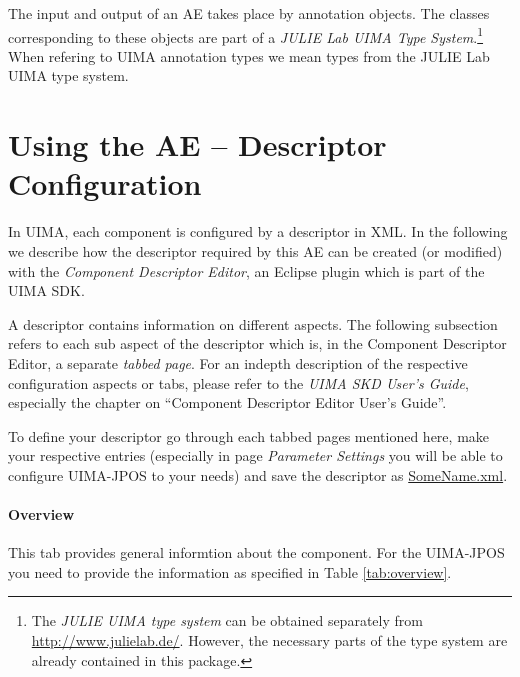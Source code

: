 \documentclass[11pt,a4paper,halfparskip]{scrartcl}
\begin{document}
The input and output of an AE takes place by annotation objects. The
classes corresponding to these objects are part of a \emph{JULIE Lab
  UIMA Type System}.\footnote{The \emph{JULIE UIMA type system} can be
  obtained separately from \url{http://www.julielab.de/}. However, the
  necessary parts of the type system are already contained in this
  package.} When refering to UIMA annotation types we mean types from
the JULIE Lab UIMA type system. 

\section{Using the AE -- Descriptor Configuration}

In UIMA, each component is configured by a descriptor in XML. In the
following we describe how the descriptor required by this AE can be
created (or modified) with the \emph{Component Descriptor Editor}, an
Eclipse plugin which is part of the UIMA SDK.

A descriptor contains information on different aspects. The following
subsection refers to each sub aspect of the descriptor which is, in
the Component Descriptor Editor, a separate \emph{tabbed page}. For an
indepth description of the respective configuration aspects or tabs,
please refer to the \emph{UIMA SKD User's
  Guide}, especially
the chapter on ``Component Descriptor Editor User's Guide''.

To define your descriptor go through each tabbed pages mentioned here,
make your respective entries (especially in page \emph{Parameter
  Settings} you will be able to configure UIMA-JPOS to your needs) and
save the descriptor as \url{SomeName.xml}.

\paragraph{Overview}
This tab provides general informtion about the component. For the UIMA-JPOS
you need to provide the information as specified in Table
\ref{tab:overview}.
\end{document}
